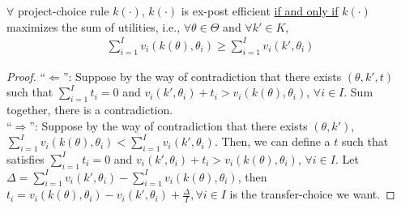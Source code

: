 \documentclass[11pt]{elegantbook_2}
\begin{document}
\begin{proposition}
    $\forall$ project-choice rule $k(\cdot)$, $k(\cdot)$ is ex-post efficient \underline{if and only if} $k(\cdot)$ maximizes the sum of utilities, i.e., $\forall \theta\in\Theta$ and $\forall k'\in K$,
    \begin{equation}
        \begin{aligned}
            \sum_{i=1}^I v_i(k(\theta),\theta_i)\geq \sum_{i=1}^I v_i(k',\theta_i)
        \end{aligned}
        \nonumber
    \end{equation}
\end{proposition}
\begin{proof}
    ``$\Leftarrow$'': Suppose by the way of contradiction that there exists $\left(\theta, k', t\right)$ such that $\sum_{i=1}^I t_i=0$ and $v_i(k',\theta_i)+t_i> v_i(k(\theta),\theta_i)$, $\forall i\in I$. Sum together, there is a contradiction.\\
    ``$\Rightarrow$'': Suppose by the way of contradiction that there exists $(\theta,k')$, $\sum_{i=1}^I v_i(k(\theta),\theta_i)<\sum_{i=1}^I v_i(k',\theta_i)$. Then, we can define a $t$ such that satisfies $\sum_{i=1}^I t_i=0$ and $v_i(k',\theta_i)+t_i> v_i(k(\theta),\theta_i)$, $\forall i\in I$. Let $\Delta=\sum_{i=1}^I v_i(k',\theta_i)-\sum_{i=1}^I v_i(k(\theta),\theta_i)$, then $t_i=v_i(k(\theta),\theta_i)-v_i(k',\theta_i)+\frac{\Delta}{I},\forall i\in I$ is the transfer-choice we want.
\end{proof}
\end{document}
